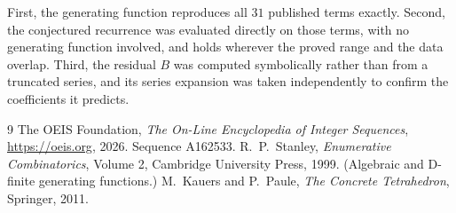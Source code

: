 \documentclass[11pt,a4paper]{article}
\theoremstyle{plain}
\theoremstyle{definition}
\begin{document}
First, the generating function reproduces all $31$ published terms exactly. Second,
the conjectured recurrence was evaluated directly on those terms, with no generating function
involved, and holds wherever the proved range and the data overlap. Third, the residual $B$ was
computed symbolically rather than from a truncated series, and its series expansion was taken
independently to confirm the coefficients it predicts.

\begin{thebibliography}{9}
 The OEIS Foundation, \emph{The On-Line Encyclopedia of Integer Sequences},
\url{https://oeis.org}, 2026. Sequence A162533.
 R.~P.~Stanley, \emph{Enumerative Combinatorics}, Volume 2, Cambridge
University Press, 1999. (Algebraic and D-finite generating functions.)
 M.~Kauers and P.~Paule, \emph{The Concrete Tetrahedron}, Springer, 2011.
\end{thebibliography}
\end{document}
